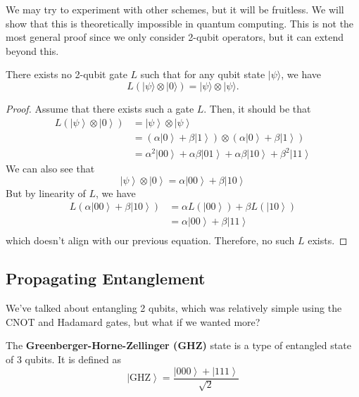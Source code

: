 \documentclass{article}
\newcommand{\ket}[1]{\ensuremath{\left|#1\right\rangle}}
\begin{document}
    We may try to experiment with other schemes, but it will be fruitless. We will show that this is theoretically impossible in quantum computing. This is not the most general proof since we only consider 2-qubit operators, but it can extend beyond this. 

    \begin{theorem}
      There exists no 2-qubit gate $L$ such that for any qubit state $|\psi \rangle$, we have 
      \begin{equation} 
        L(|\psi \rangle \otimes |0\rangle) = |\psi \rangle \otimes |\psi \rangle. 
      \end{equation}
    \end{theorem}
    \begin{proof} 
      Assume that there exists such a gate $L$. Then, it should be that 
      \begin{align} 
        L(\ket{\psi} \otimes \ket{0}) 
        & = \ket{\psi} \otimes \ket{\psi} \\
        & = (\alpha \ket{0} + \beta \ket{1}) \otimes (\alpha \ket{0} + \beta \ket{1}) \\  
        & = \alpha^2 \ket{00} + \alpha \beta \ket{01} + \alpha \beta \ket{10} + \beta^2 \ket{11}
      \end{align}
      We can also see that 
      \begin{equation} 
        \ket{\psi} \otimes \ket{0} = \alpha \ket{00} + \beta \ket{10}
      \end{equation}
      But by linearity of $L$, we have 
      \begin{align} 
        L(\alpha \ket{00} + \beta \ket{10}) & = \alpha L(\ket{00}) + \beta L(\ket{10}) \\ 
                                            & = \alpha \ket{00} + \beta \ket{11} \\
      \end{align}
      which doesn't align with our previous equation. Therefore, no such $L$ exists. 
    \end{proof}

  \subsection{Propagating Entanglement}

    We've talked about entangling 2 qubits, which was relatively simple using the CNOT and Hadamard gates, but what if we wanted more? 

    \begin{definition}
      The \textbf{Greenberger-Horne-Zellinger (GHZ)} state is a type of entangled state of 3 qubits. It is defined as 
      \begin{equation} 
        \ket{\mathrm{GHZ}} = \frac{\ket{000} + \ket{111}}{\sqrt{2}}
      \end{equation}
    \end{definition}
\end{document}
